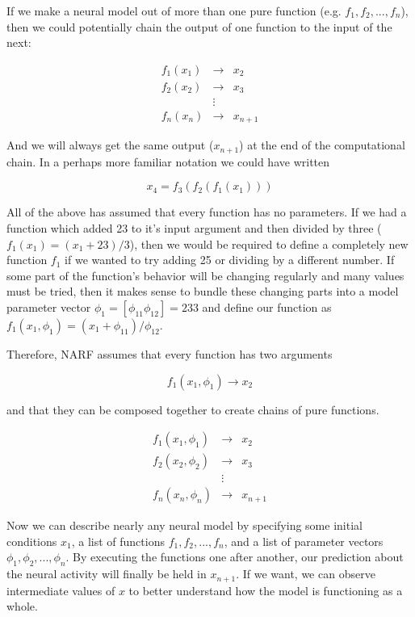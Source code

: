 \documentclass[letterpaper]{report}
\begin{document}
If we make a neural model out of more than one pure function (e.g. $f_1, f_2, ..., f_n$), then we could potentially chain the output of one function to the input of the next:

\begin{eqnarray*}
f_{1}(x_{1}) & \rightarrow & x_{2}\\
f_{2}(x_{2}) & \rightarrow & x_{3}\\
 & \vdots\\
f_{n}(x_{n}) & \rightarrow & x_{n+1}
\end{eqnarray*}

And we will always get the same output ($x_{n+1}$) at the end of the computational chain. In a perhaps more familiar notation we could have written

\begin{equation}
x_{4} = f_3(f_2(f_1(x_1)))
\end{equation}

All of the above has assumed that every function has no parameters. If we had a function which added 23 to it's input argument and then divided by three ($f_1(x_1) = (x_1 + 23) / 3 $), then we would be required to define a completely new function $f_1$ if we wanted to try adding 25 or dividing by a different number. If some part of the function's behavior will be changing regularly and many values must be tried, then it makes sense to bundle these changing parts into a model parameter vector $\phi_1 = [\phi_{11} \phi_{12}] = 23 3$ and define our function as $f_1(x_1, \phi_1) = (x_1 + \phi_{11}) / \phi_{12}$.

Therefore, NARF assumes that every function has two arguments

\begin{equation}
  f_1(x_1, \phi_1) \rightarrow x_2
\end{equation}

and that they can be composed together to create chains of pure functions. 

\begin{eqnarray*}
f_{1}(x_{1}, \phi_1) & \rightarrow & x_{2}\\
f_{2}(x_{2}, \phi_2) & \rightarrow & x_{3}\\
 & \vdots\\
f_{n}(x_{n}, \phi_n) & \rightarrow & x_{n+1}
\end{eqnarray*}

Now we can describe nearly any neural model by specifying some initial conditions $x_1$, a list of functions $f_1, f_2, ..., f_n$, and a list of parameter vectors $\phi_1, \phi_2, ..., \phi_n$. By executing the functions one after another, our prediction about the neural activity will finally be held in $x_{n+1}$. If we want, we can observe intermediate values of $x$ to better understand how the model is functioning as a whole. 
\end{document}
